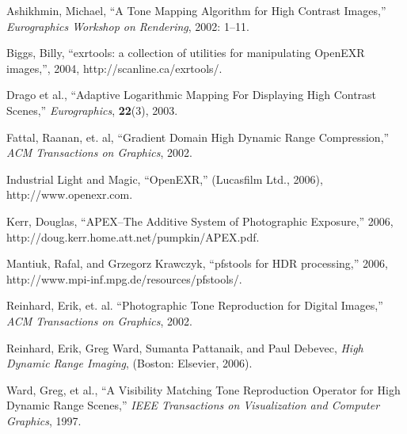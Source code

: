 \begin{thebibliography}{1}

 Ashikhmin, Michael, ``A Tone Mapping Algorithm for High Contrast Images,''
{\em Eurographics Workshop on Rendering}, 2002: 1--11.

 Biggs, Billy, ``exrtools: a collection of utilities for manipulating
OpenEXR images,'', 2004, http://scanline.ca/exrtools/.

 Drago et al., ``Adaptive Logarithmic Mapping For Displaying High Contrast Scenes,''
{\em Eurographics}, {\bf 22}(3), 2003.

 Fattal, Raanan, et. al, ``Gradient Domain High Dynamic Range Compression,''
{\em ACM Transactions on Graphics}, 2002.

 Industrial Light and Magic, ``OpenEXR,'' (Lucasfilm Ltd., 2006),
http://www.openexr.com.

 Kerr, Douglas, ``APEX--The Additive System of Photographic Exposure,'' 2006,
http://doug.kerr.home.att.net/pumpkin/APEX.pdf.

 Mantiuk, Rafal, and Grzegorz Krawczyk, ``pfstools for HDR processing,'' 2006,
http://www.mpi-inf.mpg.de/resources/pfstools/.

 Reinhard, Erik, et. al. ``Photographic Tone Reproduction for Digital Images,''
{\em ACM Transactions on Graphics}, 2002.

 Reinhard, Erik, Greg Ward, Sumanta Pattanaik, and Paul Debevec,
{\em High Dynamic Range Imaging}, (Boston: Elsevier, 2006).

 Ward, Greg, et al., ``A Visibility Matching Tone Reproduction Operator for High Dynamic Range Scenes,''
{\em IEEE Transactions on Visualization and Computer Graphics}, 1997.

\end{thebibliography}
